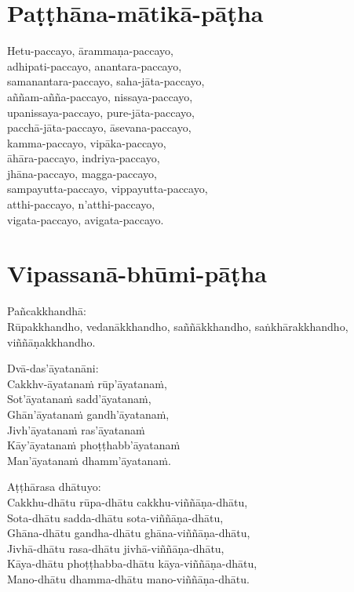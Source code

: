 

\section{Paṭṭhāna-mātikā-pāṭha}


Hetu-paccayo, ārammaṇa-paccayo,\\
adhipati-paccayo, anantara-paccayo,\\
samanantara-paccayo, saha-jāta-paccayo,\\
aññam-añña-paccayo, nissaya-paccayo,\\
upanissaya-paccayo, pure-jāta-paccayo,\\
pacchā-jāta-paccayo, āsevana-paccayo,\\
kamma-paccayo, vipāka-paccayo,\\
āhāra-paccayo, indriya-paccayo,\\
jhāna-paccayo, magga-paccayo,\\
sampayutta-paccayo, vippayutta-paccayo,\\
atthi-paccayo, n'atthi-paccayo,\\
vigata-paccayo, avigata-paccayo.


\section{Vipassanā-bhūmi-pāṭha}

\enlargethispage{\baselineskip}


Pañcakkhandhā:\\
Rūpakkhandho, vedanākkhandho, saññākkhandho, saṅkhārakkhandho, viññāṇakkhandho.

Dvā-das'āyatanāni:\\
Cakkhv-āyatanaṁ rūp'āyatanaṁ,\\
Sot'āyatanaṁ sadd'āyatanaṁ,\\
Ghān'āyatanaṁ gandh'āyatanaṁ,\\
Jivh'āyatanaṁ ras'āyatanaṁ\\
Kāy'āyatanaṁ phoṭṭhabb'āyatanaṁ\\
Man'āyatanaṁ dhamm'āyatanaṁ.

Aṭṭhārasa dhātuyo:\\
Cakkhu-dhātu rūpa-dhātu cakkhu-viññāṇa-dhātu,\\
Sota-dhātu sadda-dhātu sota-viññāṇa-dhātu,\\
Ghāna-dhātu gandha-dhātu ghāna-viññāṇa-dhātu,\\
Jivhā-dhātu rasa-dhātu jivhā-viññāṇa-dhātu,\\
Kāya-dhātu phoṭṭhabba-dhātu kāya-viññāṇa-dhātu,\\
Mano-dhātu dhamma-dhātu mano-viññāṇa-dhātu.

